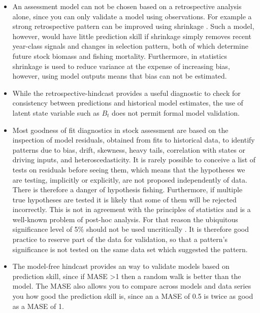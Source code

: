 \begin{itemize}
    \item An assessment model can not be chosen based on a retrospective analysis alone, since you can only validate a model using observations. For example a strong retrospective pattern can be improved using shrinkage \parencite{dickey2007precisely}. Such a model, however, would have little prediction skill if shrinkage simply removes recent year-class signals and changes in selection pattern, both of which determine future stock biomass and fishing mortality. Furthermore, in statistics shrinkage is used to reduce variance at the expense of increasing bias, however, using model outputs means that bias can not be estimated. 
    
    \item  While the retrospective-hindcast provides a useful diagnostic to check for consistency between predictions and historical model estimates, the use of latent state variable such as $B_{t}$ does not permit formal model validation. 

    \item Most goodness of fit diagnostics in stock assessment are based on the inspection of model residuals, obtained from fits to historical data, to identify patterns due to bias, drift, skewness, heavy tails, correlation with states or driving inputs, and heteroscedasticity.  It is rarely possible to conceive a list of tests on residuals before seeing them, which means that the hypotheses we are testing, implicitly or explicitly, are not proposed independently of data. There is therefore a danger of hypothesis fishing. Furthermore, if multiple true hypotheses are tested it is likely that some of them will be rejected incorrectly. This is not in agreement with the principles of statistics and is a well-known problem of post-hoc analysis. For that reason the ubiquitous significance level of 5\% should not be used uncritically \cite{wasserstein2016asa}. It is therefore good practice to reserve part of the data for validation, so that a pattern’s significance is not tested on the same data set which suggested the pattern.
    
    \item  The model-free hindcast provides an way to validate models based on prediction skill, since if MASE >1 then a random walk is better than the model. The MASE also allows you to compare across models and data series you how good the prediction skill is, since an a MASE of 0.5 is twice as good as a MASE of 1.  
    

\end{itemize}
